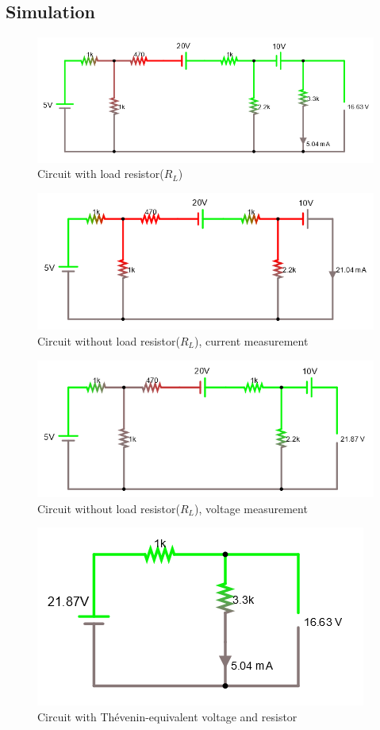 \documentclass[letterpaper]{article}
\begin{document}
\subsection{Simulation}
\begin{figure}[H]
    \centering
    \includegraphics[width=.85\linewidth]{sim1}
    \caption{Circuit with load resistor($R_L$)}
\end{figure}
\begin{figure}[H]
    \centering
    \includegraphics[width=.85\linewidth]{sim2}
    \caption{Circuit without load resistor($R_L$), current measurement}
\end{figure}
\begin{figure}[H]
    \centering
    \includegraphics[width=.85\linewidth]{sim3}
    \caption{Circuit without load resistor($R_L$), voltage measurement}
\end{figure}
\begin{figure}[H]
    \centering
    \includegraphics[width=.5\linewidth]{sim4}
    \caption{Circuit with Thévenin-equivalent voltage and resistor}
\end{figure}
\end{document}
